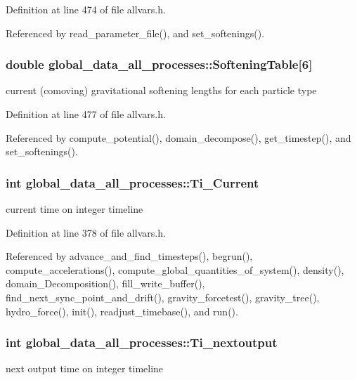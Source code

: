 Definition at line 474 of file allvars.h.



Referenced by read\_\-parameter\_\-file(), and set\_\-softenings().

\hypertarget{structglobal__data__all__processes_a5d557dca41d454bbc34153a0df2a4338}{
\subsubsection[{SofteningTable}]{\setlength{\rightskip}{0pt plus 5cm}double {\bf global\_\-data\_\-all\_\-processes::SofteningTable}\mbox{[}6\mbox{]}}}
\label{structglobal__data__all__processes_a5d557dca41d454bbc34153a0df2a4338}
current (comoving) gravitational softening lengths for each particle type 

Definition at line 477 of file allvars.h.



Referenced by compute\_\-potential(), domain\_\-decompose(), get\_\-timestep(), and set\_\-softenings().

\hypertarget{structglobal__data__all__processes_ab0720db6b598f7295ec843708a1d3c6f}{
\subsubsection[{Ti\_\-Current}]{\setlength{\rightskip}{0pt plus 5cm}int {\bf global\_\-data\_\-all\_\-processes::Ti\_\-Current}}}
\label{structglobal__data__all__processes_ab0720db6b598f7295ec843708a1d3c6f}
current time on integer timeline 

Definition at line 378 of file allvars.h.



Referenced by advance\_\-and\_\-find\_\-timesteps(), begrun(), compute\_\-accelerations(), compute\_\-global\_\-quantities\_\-of\_\-system(), density(), domain\_\-Decomposition(), fill\_\-write\_\-buffer(), find\_\-next\_\-sync\_\-point\_\-and\_\-drift(), gravity\_\-forcetest(), gravity\_\-tree(), hydro\_\-force(), init(), readjust\_\-timebase(), and run().

\hypertarget{structglobal__data__all__processes_af1655016614a8c7ae59520abae300f67}{
\subsubsection[{Ti\_\-nextoutput}]{\setlength{\rightskip}{0pt plus 5cm}int {\bf global\_\-data\_\-all\_\-processes::Ti\_\-nextoutput}}}
\label{structglobal__data__all__processes_af1655016614a8c7ae59520abae300f67}
next output time on integer timeline 

